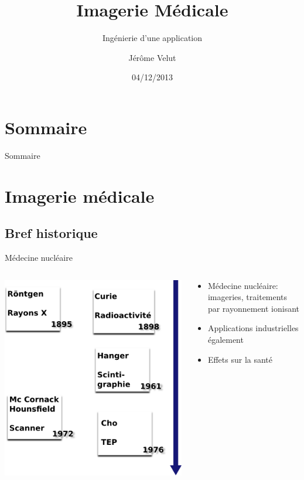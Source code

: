 \documentclass{beamer}
\title{Imagerie Médicale}
\subtitle{Ingénierie d'une application}
\author{Jérôme Velut}
\date{04/12/2013}
\begin{document}
\frame{\titlepage}

\section*{Sommaire}
\begin{frame}{Sommaire}
  \tableofcontents[hideallsubsections]
\end{frame}

\section{Imagerie médicale}
\subsection{Bref historique}
\begin{frame}{Médecine nucléaire}
\begin{columns}[T]
 \begin{column}{0.5\textwidth}
 \centering
\includegraphics[height=0.7\textheight]{images/historique_radio.png}
 \end{column}
 \begin{column}{0.5\textwidth}
\begin{itemize}
 \item Médecine nucléaire: imageries, traitements par rayonnement ionisant
 \item Applications industrielles également
 \item Effets sur la santé
\end{itemize}
 \end{column}
\end{columns}
\end{frame}
\end{document}
